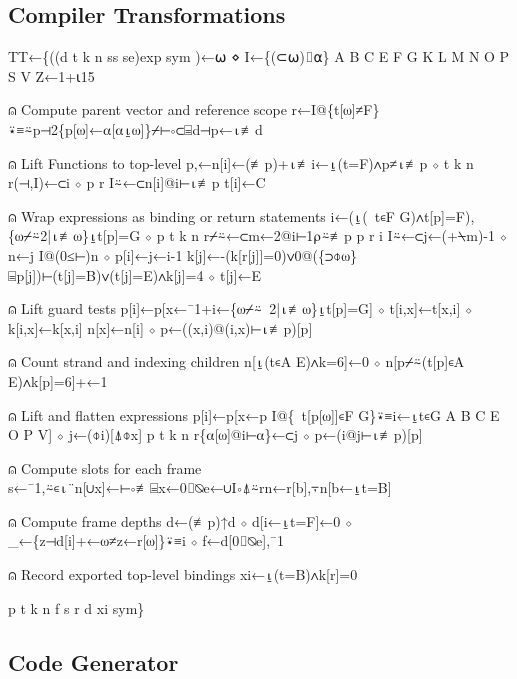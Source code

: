 \documentclass{article}%
\begin{document}
\subsection{Compiler Transformations}

\nwenddocs{}\endmoddef\nwstartdeflinemarkup{}\nwenddeflinemarkup
 TT←\{((d t k n ss se)exp sym )←⍵ ⋄ I←\{(⊂⍵)⌷⍺\}
         A B C E F G K L M N O P S V Z←1+⍳15

⍝ Compute parent vector and reference scope
         r←I@\{t[⍵]≠F\}⍣≡⍨p⊣2\{p[⍵]←⍺[⍺⍸⍵]\}⌿⊢∘⊂⌸d⊣p←⍳≢d

⍝ Lift Functions to top-level
         p,←n[i]←(≢p)+⍳≢i←⍸(t=F)∧p≠⍳≢p ⋄ t k n r(⊣,I)←⊂i ⋄ p r I⍨←⊂n[i]@i⊢⍳≢p
         t[i]←C

⍝ Wrap expressions as binding or return statements
         i←(⍸(~t∊F G)∧t[p]=F),\{⍵⌿⍨2|⍳≢⍵\}⍸t[p]=G ⋄ p t k n r⌿⍨←⊂m←2@i⊢1⍴⍨≢p
         p r i I⍨←⊂j←(+⍀m)-1 ⋄ n←j I@(0≤⊢)n ⋄ p[i]←j←i-1
         k[j]←-(k[r[j]]=0)∨0@(\{⊃⌽⍵\}⌸p[j])⊢(t[j]=B)∨(t[j]=E)∧k[j]=4 ⋄ t[j]←E

⍝ Lift guard tests
         p[i]←p[x←¯1+i←\{⍵⌿⍨~2|⍳≢⍵\}⍸t[p]=G] ⋄ t[i,x]←t[x,i] ⋄ k[i,x]←k[x,i]
         n[x]←n[i] ⋄ p←((x,i)@(i,x)⊢⍳≢p)[p]

⍝ Count strand and indexing children
         n[⍸(t∊A E)∧k=6]←0 ⋄ n[p⌿⍨(t[p]∊A E)∧k[p]=6]+←1

⍝ Lift and flatten expressions
         p[i]←p[x←p I@\{~t[p[⍵]]∊F G\}⍣≡i←⍸t∊G A B C E O P V] ⋄ j←(⌽i)[⍋⌽x]
         p t k n r\{⍺[⍵]@i⊢⍺\}←⊂j ⋄ p←(i@j⊢⍳≢p)[p]

⍝ Compute slots for each frame
         s←¯1,⍨∊⍳¨n[∪x]←⊢∘≢⌸x←0⌷⍉e←∪I∘⍋⍨rn←r[b],⍪n[b←⍸t=B]

⍝ Compute frame depths
         d←(≢p)↑d ⋄ d[i←⍸t=F]←0 ⋄ _←\{z⊣d[i]+←⍵≠z←r[⍵]\}⍣≡i ⋄ f←d[0⌷⍉e],¯1

⍝ Record exported top-level bindings
         xi←⍸(t=B)∧k[r]=0

         p t k n f s r d xi sym\}
\nwendcode{}\nwdocspar

\subsection{Code Generator}
\end{document}
